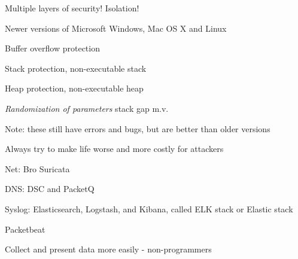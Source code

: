 \documentclass[20pt,landscape,a4paper,footrule]{foils}
\begin{document}


\centerline{\hlkbig\color{security6blue} Multiple layers of security! Isolation!}



\begin{list1}
\item Newer versions of Microsoft Windows, Mac OS X and Linux
\begin{list2}
\item Buffer overflow protection
\item Stack protection, non-executable stack
\item Heap protection, non-executable heap
\item \emph{Randomization of parameters} stack gap m.v.
\end{list2}
\item Note: these still have errors and bugs, but are better than older versions

\end{list1}

\vskip 1cm

\centerline{Always try to make life worse and more costly for attackers}


\begin{list1}
\item Net: Bro  Suricata 
\item DNS: DSC and PacketQ 
\item Syslog: Elasticsearch, Logstash, and Kibana, called ELK stack or Elastic stack
\item Packetbeat 
\end{list1}
\centerline{Collect and present data more easily - non-programmers}





\end{document}
